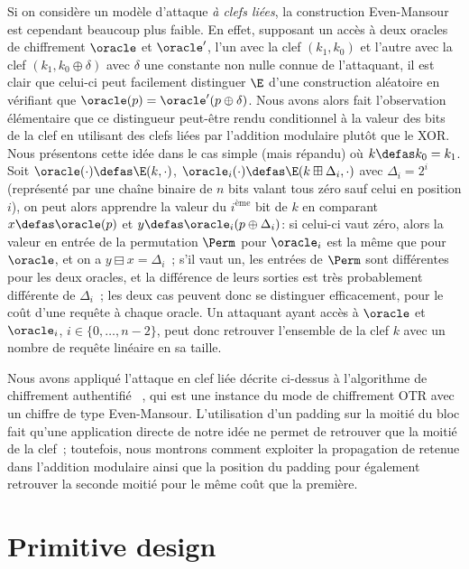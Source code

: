 Si on considère un modèle d'attaque \emph{à clefs liées}, la construction Even-Mansour est cependant beaucoup plus faible. En effet, supposant un accès à deux oracles de chiffrement
$\oracle$ et $\oracle'$, l'un avec la clef $(k_1,k_0)$ et l'autre avec la clef $(k_1,k_0\oplus\delta)$ avec $\delta$ une constante non nulle connue de l'attaquant,
il est clair que celui-ci peut facilement distinguer $\E$ d'une construction aléatoire en vérifiant que $\oracle(p) = \oracle'(p \oplus \delta)$.
Nous avons alors fait l'observation élémentaire que ce distingueur peut-être rendu conditionnel à la valeur des bits de la clef en utilisant des clefs liées par l'addition
modulaire plutôt que le XOR. Nous présentons cette idée dans le cas simple (mais répandu) où $k \defas k_0 = k_1$. Soit $\oracle(\cdot) \defas \E(k, \cdot)$, $\oracle_i(\cdot)
\defas \E(k \boxplus \Delta_i,\cdot)$ avec $\Delta_i = 2^i$ (représenté par une chaîne binaire de $n$ bits valant tous zéro sauf celui en position $i$), on peut alors
apprendre la valeur du $i^\text{ème}$ bit de $k$ en comparant $x \defas \oracle(p)$ et $y \defas \oracle_i(p \oplus \Delta_i)$: si celui-ci vaut zéro, alors la valeur
en entrée de la permutation $\Perm$ pour $\oracle_i$ est la même que pour $\oracle$, et on a $y \boxminus x = \Delta_i$~; s'il vaut un, les entrées de $\Perm$ sont différentes
pour les deux oracles, et la différence de leurs sorties est très probablement différente de $\Delta_i$~; les deux cas peuvent donc se distinguer efficacement, pour le coût
d'une requête à chaque oracle. Un attaquant ayant accès à $\oracle$ et $\oracle_i$, $i \in \{0,\ldots,n - 2\}$, peut donc retrouver l'ensemble de la clef $k$ 
avec un nombre de requête linéaire en sa taille. 

Nous avons appliqué l'attaque en clef liée décrite ci-dessus à l'algorithme de chiffrement authentifié \proestotr~\cite{proest}, qui est une instance du mode de chiffrement
OTR avec un chiffre de type Even-Mansour.  L'utilisation d'un padding sur la moitié du bloc fait qu'une application directe de notre idée ne permet de retrouver que la moitié
de la clef~; toutefois, nous montrons comment exploiter la propagation de retenue dans l'addition modulaire ainsi que la position du padding pour également retrouver la seconde moitié pour le même coût que la première.

\section[Conception de primitives]{Primitive design}

